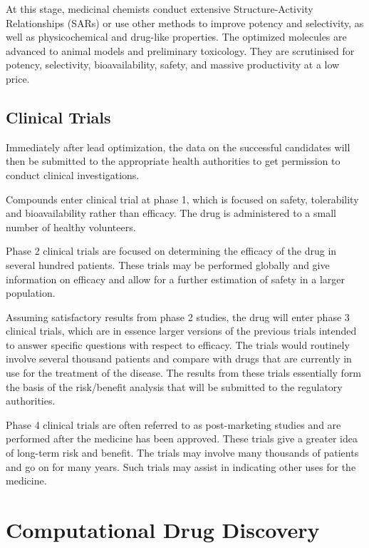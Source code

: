 At this stage, medicinal chemists conduct extensive Structure-Activity Relationships (SARs) \citep{328} or use other methods \citep{661,475} to improve potency and selectivity, as well as physicochemical and drug-like properties. The optimized molecules are advanced to animal models and preliminary toxicology. They are scrutinised for potency, selectivity, bioavailability, safety, and massive productivity at a low price.

\subsection{Clinical Trials}

Immediately after lead optimization, the data on the successful candidates will then be submitted to the appropriate health authorities to get permission to conduct clinical investigations.

Compounds enter clinical trial at phase 1, which is focused on safety, tolerability and bioavailability rather than efficacy. The drug is administered to a small number of healthy volunteers.

Phase 2 clinical trials are focused on determining the efficacy of the drug in several hundred patients. These trials may be performed globally and give information on efficacy and allow for a further estimation of safety in a larger population.

Assuming satisfactory results from phase 2 studies, the drug will enter phase 3 clinical trials, which are in essence larger versions of the previous trials intended to answer specific questions with respect to efficacy. The trials would routinely involve several thousand patients and compare with drugs that are currently in use for the treatment of the disease. The results from these trials essentially form the basis of the risk/benefit analysis that will be submitted to the regulatory authorities.

Phase 4 clinical trials are often referred to as post-marketing studies and are performed after the medicine has been approved. These trials give a greater idea of long-term risk and benefit. The trials may involve many thousands of patients and go on for many years. Such trials may assist in indicating other uses for the medicine.

\section{Computational Drug Discovery}

